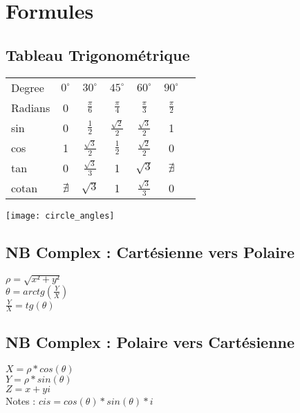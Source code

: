 
\newpage
\chapter{Formules}

\section{Tableau Trigonométrique}
\begin{tabular}{|l|c|c|c|c|c|c|}
  \hline
  Degree & $0^{\circ}$ & $30^{\circ}$ & $45^{\circ}$  & $60^{\circ}$ & $90^{\circ}$ \\
  Radians & 0 & $\frac{\pi}{6}$ & $\frac{\pi}{4}$ & $\frac{\pi}{3}$ &  $\frac{\pi}{2}$ \\
  \hline
  sin & 0 & $\frac{1}{2}$ & $\frac{\sqrt{2}} {2}$ & $\frac{\sqrt{3}} {2}$ & 1 \\
  cos & 1 & $\frac{\sqrt{3}} {2}$ & $\frac{1}{2}$ & $\frac{\sqrt{2}} {2}$ & 0 \\
  tan & 0 & $\frac{\sqrt{3}} {3}$ & 1 & $\sqrt{3}$ & $\nexists$ \\
  cotan & $\nexists$ & $\sqrt{3}$ & 1 & $\frac{\sqrt{3}} {3}$ & 0 \\
  \hline
\end{tabular}

\vspace{4mm} %
\texttt{[image: circle\_angles]}


\newpage
\vspace{4mm} %
\section{NB Complex : Cartésienne vers Polaire}
$\rho = \sqrt{x²+y²}$ \\
$\theta = arctg(\frac{Y}{X})$ \\
$\frac{Y}{X} = tg(\theta)$ \\

\vspace{4mm} %
\section{NB Complex : Polaire vers Cartésienne}
$X= \rho * cos(\theta)$ \\
$Y= \rho * sin(\theta)$ \\
$Z= x+yi $ \\
Notes : $cis = cos(\theta) * sin(\theta) *i$ \\

